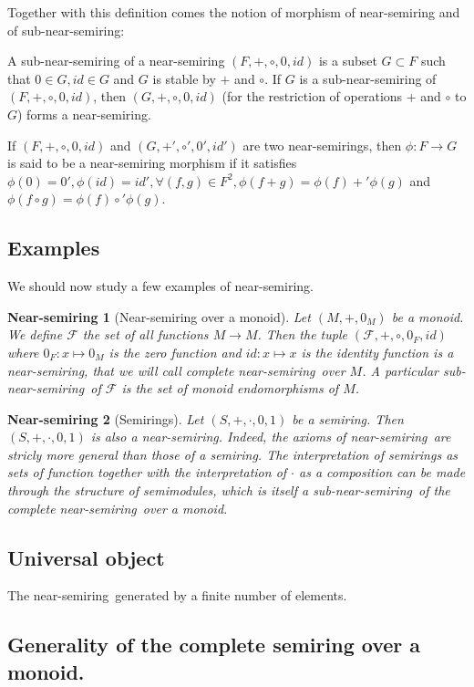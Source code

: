 \documentclass[11pt,a4paper]{article}
\newcommand{\mcal}[1]{\mathcal{#1}}
\newcommand{\Ns}{near-semiring}
\newtheorem{ns}{Near-semiring}
\begin{document}
Together with this definition comes the notion of morphism of near-semiring and of sub-near-semiring:

A sub-near-semiring of a near-semiring $(F,+,\circ,0,id)$ is a subset $G \subset F$ such that $0 \in G, id \in G$ and $G$ is stable by $+$ and $\circ$. If $G$ is a sub-near-semiring of $(F,+,\circ,0,id)$, then $(G,+,\circ,0,id)$ (for the restriction of operations + and $\circ$ to $G$) forms a near-semiring.

If $(F,+,\circ,0,id)$ and $(G,+',\circ ',0',id')$ are two near-semirings, then $\phi : F \to G$ is said to be a near-semiring morphism if it satisfies $\phi(0)=0',\phi(id)=id',\forall (f,g) \in F^2, \phi(f+g) = \phi(f) +' \phi(g)$ and $ \phi(f \circ g)= \phi(f) \circ' \phi(g)$.

\subsection{Examples}

We should now study a few examples of near-semiring.

\begin{ns}[Near-semiring over a monoid]
\label{ns:ns_over_a_monoid}
	Let $(M,+,0_M)$ be a monoid. We define $\mcal{F}$ the set of all functions $M \to M$. Then the tuple $(\mcal{F},+,\circ,0_F,id)$ where $0_F : x \mapsto 0_M$ is the zero function and $id : x \mapsto x$ is the identity function is a near-semiring, that we will call complete \Ns\ over $M$. A particular sub-\Ns\ of $\mcal{F}$ is the set of monoid endomorphisms of $M$.
\end{ns}

\begin{ns}[Semirings]
\label{ns:semirings}
	Let $(S,+,\cdot,0,1)$ be a semiring. Then $(S,+,\cdot,0,1)$ is also a \Ns . Indeed, the axioms of \Ns\ are stricly more general than those of a semiring. The interpretation of semirings as sets of function together with the interpretation of $\cdot$ as a composition can be made through the structure of semimodules, which is itself a sub-\Ns\ of the complete \Ns\ over a monoid.
\end{ns}

\subsection{Universal object}

The \Ns\ generated by a finite number of elements.

\subsection{Generality of the complete semiring over a monoid.}
\end{document}
